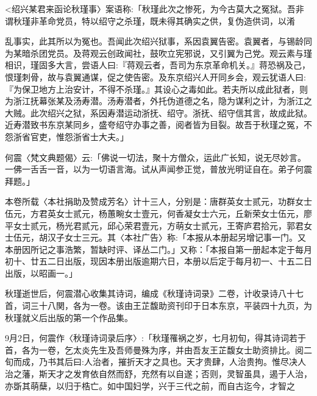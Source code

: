 <绍兴某君来函论秋瑾事〉案语称:「秋瑾此次之惨死，为今古莫大之冤狱。吾非谓秋瑾非革命党员，特以绍守之杀瑾，既未得其确实之供，复伪造供词，以淆


\noindent 乱事实，此其所以为冤也。吾闻此次绍兴狱事，系因袁翼告密。袁翼者，与锡龄同为某暗杀团党员。及蒋观云创政闻社，鼓吹立宪邪说，又引翼为己党。观云素与瑾相识，瑾固多大言，尝语人曰:『蒋观云者，吾司为东京革命机关。』蒋恐祸及己，恨瑾刺骨，故与袁翼通谋，促之使告密。及东京绍兴人开同乡会，观云犹语人曰:『为保卫地方上治安计，不得不杀瑾。』其设心之毒如此。若夫所以成此狱者，则为浙江抚幕张某及汤寿潜。汤寿潜者，外托伪道德之名，隐为谋利之计，为浙江之大贼。此次绍兴之狱，系因寿潜运动浙抚、绍守。浙抚、绍守信其言，故成此狱。近寿潜致书东京某同乡，盛夸绍守办事之善，阅者皆为目裂。故吾于秋瑾之冤，不怨浙省官吏，惟怨浙省士大夫。」

何震〈梵文典题偈〉云:「佛说一切法，聚十方僧众，运此广长知，说无尽妙言。一佛一舌舌一音，以为一切语言海。试从声闻参正觉，普放光明证自在。弟子何震拜题。」

本卷所载〈本社捐助及赞成芳名〉计十三人，分别是：唐群英女士贰元，功群女士伍元，方君英女士贰元，杨蕙畹女士壹元，何香凝女士六元，丘新荣女士伍元，廖平女士贰元，杨光君贰元，邱心荣君壹元，方萌女士贰元，王寄庐君拾元，郭君女士伍元，胡汉子女士三元。其〈本社广告〉称:「本报从本册起另增记事一门。又本册因所记之事浩繁，暂缺时评、译丛二门。」又称：「本报自第一册起本定于每月初十、廿五二日出版，现因本册出版逾期六日，本册以后定于每月初一、十五二日出版，以昭画一。」

秋瑾逝世后，何震潜心收集其诗词，编成《秋瑾诗词录》二卷，计收录诗八十七首，词三十八関，各为一卷。该由王芷馥助资刊印于日本东京，平装四十九页，为秋瑾就义后出版的第一个作品集。

9月2日，何震作〈秋瑾诗词录后序〉:「秋瑾罹祸之岁，七月初旬，得其诗词若于首，各为一卷，乞太炎先生及吾师曼殊为序，并由吾友王芷馥女士助资排比。阅二旬而成，乃书其后曰:人治者，摧折天才之具也。天才贵肆，人治贵拘。惟尽决人治之藩，斯天才之发育依自然而舒，充然有以自遂；否则，灵智虽具，遏于人治，亦斲其萌蘖，以归于梏亡。如中国妇学，兴于三代之前，而自古迄今，才智之



